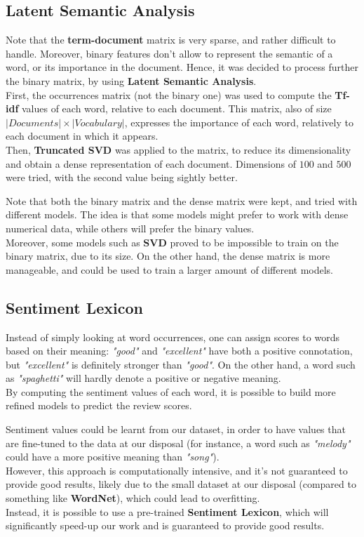 \documentclass[
12pt,
a4paper,
oneside,
headinclude,
footinclude]{article}
\theoremstyle{definition} %
\begin{document}
\subsection{Latent Semantic Analysis}

Note that the \textbf{term-document} matrix is very sparse, and rather difficult to handle. Moreover, binary features don't allow to represent the semantic of a word, or its importance in the document. Hence, it was decided to process further the binary matrix, by using \textbf{Latent Semantic Analysis}. \\
First, the occurrences matrix (not the binary one) was used to compute the \textbf{Tf-idf} values of each word, relative to each document. This matrix, also of size $|Documents| \times |Vocabulary|$, expresses the importance of each word, relatively to each document in which it appears.\\
Then, \textbf{Truncated SVD} was applied to the matrix, to reduce its dimensionality and obtain a dense representation of each document. Dimensions of $100$ and $500$ were tried, with the second value being sightly better.

Note that both the binary matrix and the dense matrix were kept, and tried with different models. The idea is that some models might prefer to work with dense numerical data, while others will prefer the binary values.\\
Moreover, some models such as \textbf{SVD} proved to be impossible to train on the binary matrix, due to its size. On the other hand, the dense matrix is more manageable, and could be used to train a larger amount of different models.

\subsection{Sentiment Lexicon}
Instead of simply looking at word occurrences, one can assign scores to words based on their meaning: \textit{"good"} and \textit{"excellent"} have both a positive connotation, but \textit{"excellent"} is definitely stronger than \textit{"good"}. On the other hand, a word such as \textit{"spaghetti"} will hardly denote a positive or negative meaning.\\
By computing the sentiment values of each word, it is possible to build more refined models to predict the review scores.

Sentiment values could be learnt from our dataset, in order to have values that are fine-tuned to the data at our disposal (for instance, a word such as \textit{"melody"} could have a more positive meaning than \textit{"song"}).\\
However, this approach is computationally intensive, and it's not guaranteed to provide good results, likely due to the small dataset at our disposal (compared to something like \textbf{WordNet}), which could lead to overfitting.\\
Instead, it is possible to use a pre-trained \textbf{Sentiment Lexicon}, which will significantly speed-up our work and is guaranteed to provide good results.
\end{document}
